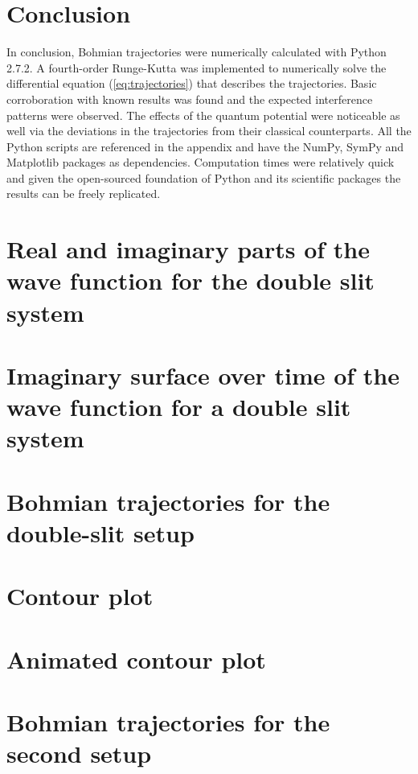 \documentclass[10pt, reqno]{article}
\begin{document}
\section{Conclusion}

  In conclusion, Bohmian trajectories were numerically calculated with Python 2.7.2.
  A fourth-order Runge-Kutta was implemented to numerically solve the differential equation (\ref{eq:trajectories}) that describes the trajectories.
  Basic corroboration with known results was found and the expected interference patterns were observed.
  The effects of the quantum potential were noticeable as well via the deviations in the trajectories from their classical counterparts.
  All the Python scripts are referenced in the appendix and have the NumPy, SymPy and Matplotlib packages as dependencies.
  Computation times were relatively quick and given the open-sourced foundation of Python and its scientific packages the results can be freely replicated.

\pagebreak




\pagebreak

\appendix
{}

\section{Real and imaginary parts of the wave function for the double slit system}
\label{appendix:real-imag}

\pagebreak

\section{Imaginary surface over time of the wave function for a double slit system}
\label{appendix:imaginary-surface}

\pagebreak 

\section{Bohmian trajectories for the double-slit setup}
\label{appendix:bohmian-trajectories}

\pagebreak 

\section{Contour plot}
\label{appendix:contour-plot}

\pagebreak 

\section{Animated contour plot}
\label{appendix:contour-plot-animated}

\pagebreak 

\section{Bohmian trajectories for the second setup}
\label{appendix:secondary-trajectories}

\pagebreak 
\end{document}
